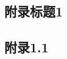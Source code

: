 \documentclass[12pt,openany,a4paper]{report}
\begin{document}
\begin{appendix}
\chapter{附录标题1}
	\section{附录1.1}
\end{appendix}
\end{document}
